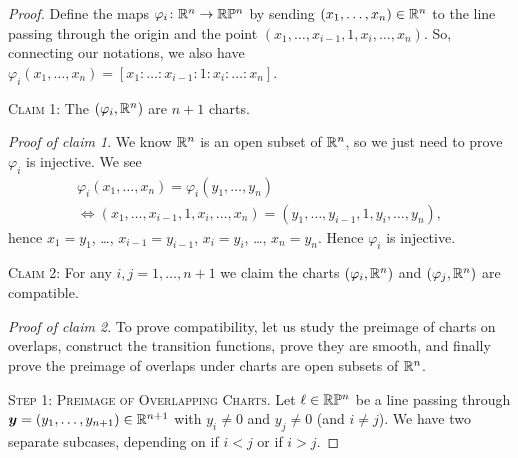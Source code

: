 \begin{proof}
  Define the maps $\varphi_{i}\colon\mathbb{R}^{n}\to\mathbb{R}\mathbb{P}^{n}$ by
sending $(x_{1},\dots,x_{n})\in\mathbb{R}^{n}$ to the line passing through the
origin and the point $(x_{1},\dots,x_{i-1},1,x_{i},\dots,x_{n})$.
So, connecting our notations, we also have $\varphi_{i}(x_{1},\dots,x_{n})=[x_{1} : \dots : x_{i-1} : 1 : x_{i} : \dots : x_{n}]$.

\smallbreak
  \textsc{Claim 1:} The $(\varphi_{i},\mathbb{R}^{n})$ are $n+1$ charts.

\noindent\textit{Proof of claim 1}. We know $\mathbb{R}^{n}$ is an open subset
of $\mathbb{R}^{n}$, so we just need to prove $\varphi_{i}$ is injective. We
see
\begin{multline}
  \varphi_{i}(x_{1},\dots,x_{n})=\varphi_{i}(y_{1},\dots,y_{n})\\
\iff (x_{1},\dots,x_{i-1},1,x_{i},\dots,x_{n})
= (y_{1},\dots,y_{i-1},1,y_{i},\dots,y_{n}),
\end{multline}
hence $x_{1}=y_{1}$, \dots, $x_{i-1}=y_{i-1}$, $x_{i}=y_{i}$, \dots, $x_{n}=y_{n}$.
Hence $\varphi_{i}$ is injective.

\smallbreak
  \textsc{Claim 2:} For any $i,j=1,\dots,n+1$ we claim the charts
$(\varphi_{i},\mathbb{R}^{n})$ and $(\varphi_{j},\mathbb{R}^{n})$ are compatible.

\noindent\textit{Proof of claim 2}. To prove compatibility, let us study
the preimage of charts on overlaps,
construct the transition functions, prove they are smooth, and finally
prove the preimage of overlaps under charts are open subsets of $\mathbb{R}^{n}$.

\textsc{Step 1: Preimage of Overlapping Charts.}
Let $\ell\in\mathbb{R}\mathbb{P}^{n}$ be a line passing through $\boldsymbol{y}=(y_{1},\dots,y_{n+1})\in\mathbb{R}^{n+1}$
with $y_{i}\neq0$ and $y_{j}\neq0$ (and $i\neq j$). We have two separate
subcases, depending on if $i<j$ or if $i>j$.


\end{proof}
